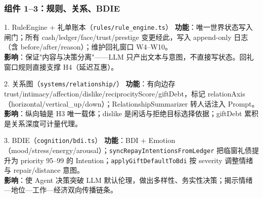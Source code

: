 \documentclass[AutoFakeBold,AutoFakeSlant]{beamer}
\begin{document}
\begin{frame}
    \frametitle{组件 1--3：规则、关系、BDIE}
    \scriptsize
    \begin{block}{1. RuleEngine + 礼单账本（\texttt{rules/rule\_engine.ts}）}
        \textbf{功能}：唯一世界状态写入闸门；所有 cash/ledger/face/trust/prestige 变更经此，写入 append-only 日志（含 before/after/reason）；维护回礼窗口 W4--W10。\\
        \textbf{影响}：保证"内容与决策分离"——LLM 只产出文本与意图，不直接写状态。回礼窗口规则直接支撑 H4（延迟互惠）。
    \end{block}
    \begin{block}{2. 关系图（\texttt{systems/relationship/}）}
        \textbf{功能}：有向边存 trust/intimacy/affection/dislike/reciprocityScore/giftDebt，标记 relationAxis（horizontal/vertical\_up/down）；RelationshipSummarizer 转人话注入 Prompt。\\
        \textbf{影响}：纵向轴是 H3 唯一载体；dislike 是闲话与拒绝目标选择依据；giftDebt 累积是关系深度可计量代理。
    \end{block}
    \begin{block}{3. BDIE（\texttt{cognition/bdi.ts}）}
        \textbf{功能}：BDI + Emotion（mood/stress/energy/arousal）；\texttt{syncRepayIntentionsFromLedger} 把临窗礼债提升为 priority 95--99 的 Intention；\texttt{applyGiftDefaultToBdi} 按 severity 调整情绪与 repair/distance 意图。\\
        \textbf{影响}：使 Agent 决策突破 LLM 默认伦理，做出多样性、务实性决策；揭示情绪—地位—工作—经济双向传播链条。
    \end{block}
\end{frame}
\end{document}
